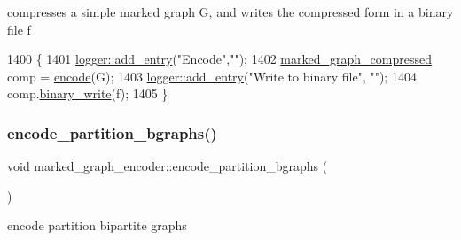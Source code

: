 compresses a simple marked graph G, and writes the compressed form in a binary file f 


\begin{DoxyCode}
1400                                                                \{
1401   \hyperlink{classlogger_a710163deb17bc81f70d53d285b8ac9ac}{logger::add\_entry}(\textcolor{stringliteral}{"Encode"},\textcolor{stringliteral}{""});
1402   \hyperlink{classmarked__graph__compressed}{marked\_graph\_compressed} comp = \hyperlink{classmarked__graph__encoder_aa7fa19a225dd9b31d6fef9583fab8cf1}{encode}(G);
1403   \hyperlink{classlogger_a710163deb17bc81f70d53d285b8ac9ac}{logger::add\_entry}(\textcolor{stringliteral}{"Write to binary file"}, \textcolor{stringliteral}{""});
1404   comp.\hyperlink{classmarked__graph__compressed_ab9cdb7fc43badd58fb5202f74ffac723}{binary\_write}(f);
1405 \}
\end{DoxyCode}
\mbox{\label{classmarked__graph__encoder_aa113c4870e3221faa332b2151b63d9e6}} 
\subsubsection{\texorpdfstring{encode\+\_\+partition\+\_\+bgraphs()}{encode\_partition\_bgraphs()}}
{\footnotesize\ttfamily void marked\+\_\+graph\+\_\+encoder\+::encode\+\_\+partition\+\_\+bgraphs (\begin{DoxyParamCaption}{ }\end{DoxyParamCaption})\hspace{0.3cm}{\ttfamily [private]}}



encode partition bipartite graphs 


